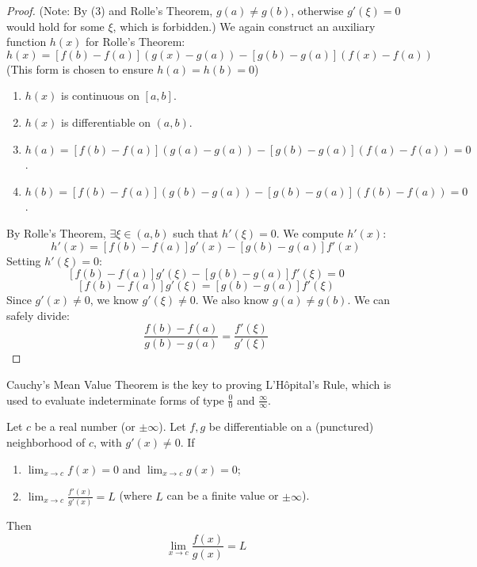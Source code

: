 \begin{proof}
(Note: By (3) and Rolle's Theorem, $g(a) \neq g(b)$, otherwise $g'(\xi)=0$ would hold for some $\xi$, which is forbidden.)
We again construct an auxiliary function $h(x)$ for Rolle's Theorem:
\[
h(x) = [f(b) - f(a)](g(x) - g(a)) - [g(b) - g(a)](f(x) - f(a))
\]
(This form is chosen to ensure $h(a)=h(b)=0$)
\begin{enumerate}
    \item $h(x)$ is continuous on $[a, b]$.
    \item $h(x)$ is differentiable on $(a, b)$.
    \item $h(a) = [f(b) - f(a)](g(a) - g(a)) - [g(b) - g(a)](f(a) - f(a)) = 0$.
    \item $h(b) = [f(b) - f(a)](g(b) - g(a)) - [g(b) - g(a)](f(b) - f(a)) = 0$.
\end{enumerate}
By Rolle's Theorem, $\exists \xi \in (a, b)$ such that $h'(\xi) = 0$.
We compute $h'(x)$:
\[
h'(x) = [f(b) - f(a)]g'(x) - [g(b) - g(a)]f'(x)
\]
Setting $h'(\xi) = 0$:
\[
[f(b) - f(a)]g'(\xi) - [g(b) - g(a)]f'(\xi) = 0
\]
\[
[f(b) - f(a)]g'(\xi) = [g(b) - g(a)]f'(\xi)
\]
Since $g'(x) \neq 0$, we know $g'(\xi) \neq 0$. We also know $g(a) \neq g(b)$. We can safely divide:
\[
\frac{f(b) - f(a)}{g(b) - g(a)} = \frac{f'(\xi)}{g'(\xi)}
\]
\end{proof}

Cauchy's Mean Value Theorem is the key to proving L'Hôpital's Rule, which is used to evaluate indeterminate forms of type $\frac{0}{0}$ and $\frac{\infty}{\infty}$.

\begin{theorem}
\label{thm:lhopital_zero_en}
Let $c$ be a real number (or $\pm\infty$). Let $f, g$ be differentiable on a (punctured) neighborhood of $c$, with $g'(x) \neq 0$.
If
\begin{enumerate}
    \item $\lim_{x \to c} f(x) = 0$ and $\lim_{x \to c} g(x) = 0$;
    \item $\lim_{x \to c} \frac{f'(x)}{g'(x)} = L$ (where $L$ can be a finite value or $\pm\infty$).
\end{enumerate}
Then
\[
\lim_{x \to c} \frac{f(x)}{g(x)} = L
\]
\end{theorem}

